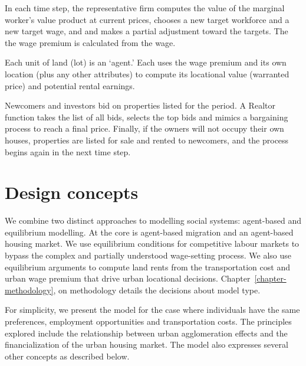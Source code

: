 In each time step, the representative firm computes the value of the marginal worker's value product at current prices, chooses a new target workforce and a new target wage, and and makes a partial adjustment toward the targets. The the wage premium is calculated from the wage.

Each unit of land (lot) is an `agent.' Each uses the wage premium and its own location (plus any other attributes) to compute its locational value (warranted price) and potential rental earnings.  

Newcomers and investors bid on properties listed for the period. A Realtor function takes the list of all bids, selects the top bids and mimics a bargaining process to reach a final price. {\color{red}Finally, if the owners will not occupy their own houses, properties are listed for sale and rented to newcomers, and the process begins again in the next time step.}



\section{Design concepts}



We combine two distinct approaches to modelling social systems: agent-based and equilibrium modelling. At the core is  agent-based migration and an agent-based housing market. We use equilibrium conditions for competitive labour markets to bypass the complex and partially understood wage-setting process. We also use equilibrium arguments to compute land rents from the transportation cost and urban wage premium that drive urban locational decisions. Chapter~\ref{chapter-methodology}, on methodology details the decisions about model type.

For simplicity, we present the model for the case where individuals have the same preferences, employment opportunities and transportation costs. The principles explored include the relationship between urban agglomeration effects and the financialization of the urban housing market. The model also expresses several other concepts as described below.

